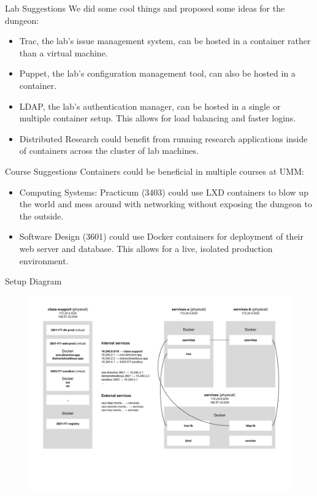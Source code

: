 \documentclass[xcolor=dvipsnames,aspectratio=1610]{beamer}
\begin{document}
  \begin{frame}{Lab Suggestions}
      We did some cool things and proposed some ideas for the dungeon:
      \begin{itemize}
          \item \alert{Trac}, the lab's issue management system, can be hosted in a container rather than a virtual machine.
          \item \alert{Puppet}, the lab's configuration management tool, can also be hosted in a container.
          \item \alert{LDAP}, the lab's authentication manager, can be hosted in a single or multiple container setup. This allows for load balancing and faster logins.
          \item \alert{Distributed Research} could benefit from running research applications inside of containers across the cluster of lab machines.
      \end{itemize}
  \end{frame}

  \begin{frame}{Course Suggestions}
      Containers could be beneficial in multiple courses at UMM:
      \begin{itemize}
          \item \alert{Computing Systems: Practicum} (3403) could use LXD containers to blow up the world and mess around with networking without exposing the dungeon to the outside.
          \item \alert{Software Design} (3601) could use Docker containers for deployment of their web server and database. This allows for a live, isolated production environment.
      \end{itemize}
  \end{frame}

  \begin{frame}{Setup Diagram}
      \vspace{-30px}
      \begin{figure}
        \includegraphics[scale=0.56]{proposal.pdf}
      \end{figure}
  \end{frame}
\end{document}
